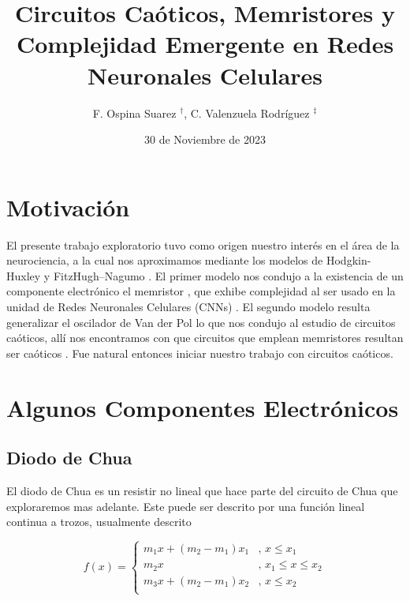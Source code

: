 \documentclass[11pt,letterpaper]{article}
\title{\textbf{Circuitos Caóticos, Memristores y Complejidad Emergente en Redes Neuronales Celulares}
}
\author{F. Ospina Suarez \hyperlink{felipe}{$^\dag$}, C. Valenzuela Rodríguez \hyperlink{carolina}{$^\ddag$}
}
\date{30 de Noviembre de 2023
}
\begin{document}
\maketitle
\hline
\thispagestyle{Primera pagina}

\begin{multicols*}{2}

\section*{Motivación}

El presente trabajo exploratorio tuvo como origen nuestro interés en el área de la neurociencia, a la cual nos aproximamos mediante los modelos de Hodgkin-Huxley \cite{Hodgkin1952} y FitzHugh–Nagumo \cite{FitzHugh1961}\cite{Nagumo1962}. El primer modelo nos condujo a la existencia de un componente electrónico \cite{Chua2012} el memristor \cite{Chua1971}, que exhibe complejidad al ser usado en la unidad de Redes Neuronales Celulares (CNNs) \cite{Pham2012}\cite{Buscarino2016}\cite{Buscarino2018}. El segundo modelo resulta generalizar el oscilador de Van der Pol \cite{VanderPol1920} lo que nos condujo al estudio de circuitos caóticos, allí nos encontramos con que circuitos que emplean memristores resultan ser caóticos \cite{Itoh2008}\cite{Buscarino2012a}\cite{Buscarino2012b}. Fue natural entonces iniciar nuestro trabajo con circuitos caóticos.

\section*{Algunos Componentes Electrónicos}
\subsection*{Diodo de Chua}

El diodo de Chua es un resistir no lineal que hace parte del circuito de Chua que exploraremos mas adelante. Este puede ser descrito por una función lineal continua a trozos, usualmente descrito 

\begin{equation}
\label{Eq:ChuaDiode}
    f(x) = 
\begin{cases}
m_1 x + (m_2-m_1)x_1 & \text{, $x\leq x_1$}\\
m_2 x  & \text{, $x_1\leq x\leq x_2$}\\                    
m_3 x + (m_2-m_1)x_2 & \text{, $x\leq x_2$}\\
\end{cases}
\end{equation}


\end{multicols*}
\end{document}
